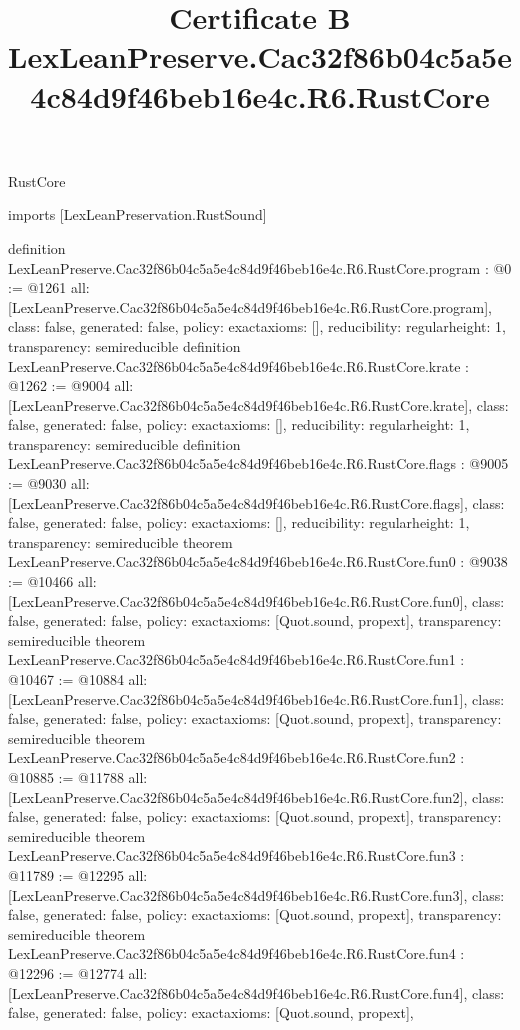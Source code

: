 \begin{lexlean}{RustCore}
\title{Certificate B LexLeanPreserve.Cac32f86b04c5a5e4c84d9f46beb16e4c.R6.RustCore}
\begin{coremodule}
imports [LexLeanPreservation.RustSound]

definition LexLeanPreserve.Cac32f86b04c5a5e4c84d9f46beb16e4c.R6.RustCore.program : @0 := @1261 {
  all: [LexLeanPreserve.Cac32f86b04c5a5e4c84d9f46beb16e4c.R6.RustCore.program],
  class: false,
  generated: false,
  policy: exact{axioms: []},
  reducibility: regular{height: 1},
  transparency: semireducible
}
definition LexLeanPreserve.Cac32f86b04c5a5e4c84d9f46beb16e4c.R6.RustCore.krate : @1262 := @9004 {
  all: [LexLeanPreserve.Cac32f86b04c5a5e4c84d9f46beb16e4c.R6.RustCore.krate],
  class: false,
  generated: false,
  policy: exact{axioms: []},
  reducibility: regular{height: 1},
  transparency: semireducible
}
definition LexLeanPreserve.Cac32f86b04c5a5e4c84d9f46beb16e4c.R6.RustCore.flags : @9005 := @9030 {
  all: [LexLeanPreserve.Cac32f86b04c5a5e4c84d9f46beb16e4c.R6.RustCore.flags],
  class: false,
  generated: false,
  policy: exact{axioms: []},
  reducibility: regular{height: 1},
  transparency: semireducible
}
theorem LexLeanPreserve.Cac32f86b04c5a5e4c84d9f46beb16e4c.R6.RustCore.fun0 : @9038 := @10466 {
  all: [LexLeanPreserve.Cac32f86b04c5a5e4c84d9f46beb16e4c.R6.RustCore.fun0],
  class: false,
  generated: false,
  policy: exact{axioms: [Quot.sound, propext]},
  transparency: semireducible
}
theorem LexLeanPreserve.Cac32f86b04c5a5e4c84d9f46beb16e4c.R6.RustCore.fun1 : @10467 := @10884 {
  all: [LexLeanPreserve.Cac32f86b04c5a5e4c84d9f46beb16e4c.R6.RustCore.fun1],
  class: false,
  generated: false,
  policy: exact{axioms: [Quot.sound, propext]},
  transparency: semireducible
}
theorem LexLeanPreserve.Cac32f86b04c5a5e4c84d9f46beb16e4c.R6.RustCore.fun2 : @10885 := @11788 {
  all: [LexLeanPreserve.Cac32f86b04c5a5e4c84d9f46beb16e4c.R6.RustCore.fun2],
  class: false,
  generated: false,
  policy: exact{axioms: [Quot.sound, propext]},
  transparency: semireducible
}
theorem LexLeanPreserve.Cac32f86b04c5a5e4c84d9f46beb16e4c.R6.RustCore.fun3 : @11789 := @12295 {
  all: [LexLeanPreserve.Cac32f86b04c5a5e4c84d9f46beb16e4c.R6.RustCore.fun3],
  class: false,
  generated: false,
  policy: exact{axioms: [Quot.sound, propext]},
  transparency: semireducible
}
theorem LexLeanPreserve.Cac32f86b04c5a5e4c84d9f46beb16e4c.R6.RustCore.fun4 : @12296 := @12774 {
  all: [LexLeanPreserve.Cac32f86b04c5a5e4c84d9f46beb16e4c.R6.RustCore.fun4],
  class: false,
  generated: false,
  policy: exact{axioms: [Quot.sound, propext]},
}
\end{coremodule}
\end{lexlean}
